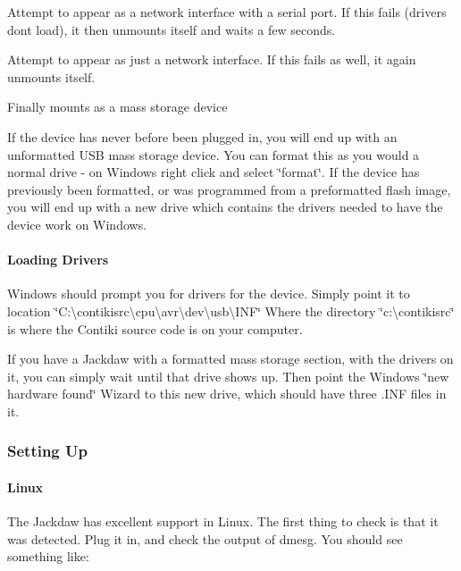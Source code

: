 \begin{DoxyItemize}
\item Attempt to appear as a network interface with a serial port. If this fails (drivers don\textquotesingle{}t load), it then unmounts itself and waits a few seconds.
\item Attempt to appear as just a network interface. If this fails as well, it again unmounts itself.
\item Finally mounts as a mass storage device
\end{DoxyItemize}

If the device has never before been plugged in, you will end up with an unformatted U\+SB mass storage device. You can format this as you would a normal drive -\/ on Windows right click and select \char`\"{}format\char`\"{}. If the device has previously been formatted, or was programmed from a preformatted flash image, you will end up with a new drive which contains the drivers needed to have the device work on Windows.\hypertarget{a00067_loaddrivers}{}\paragraph{Loading Drivers}\label{a00067_loaddrivers}
Windows should prompt you for drivers for the device. Simply point it to location \char`\"{}\+C\+:\textbackslash{}contikisrc\textbackslash{}cpu\textbackslash{}avr\textbackslash{}dev\textbackslash{}usb\textbackslash{}\+I\+N\+F\char`\"{} Where the directory \char`\"{}c\+:\textbackslash{}contikisrc\char`\"{} is where the Contiki source code is on your computer.

If you have a Jackdaw with a formatted mass storage section, with the drivers on it, you can simply wait until that drive shows up. Then point the Windows \char`\"{}new hardware found\char`\"{} Wizard to this new drive, which should have three .I\+NF files in it.\hypertarget{a00067_setup}{}\subsubsection{Setting Up}\label{a00067_setup}
\hypertarget{a00067_Linux}{}\paragraph{Linux}\label{a00067_Linux}
The Jackdaw has excellent support in Linux. The first thing to check is that it was detected. Plug it in, and check the output of \textquotesingle{}dmesg\textquotesingle{}. You should see something like\+:

